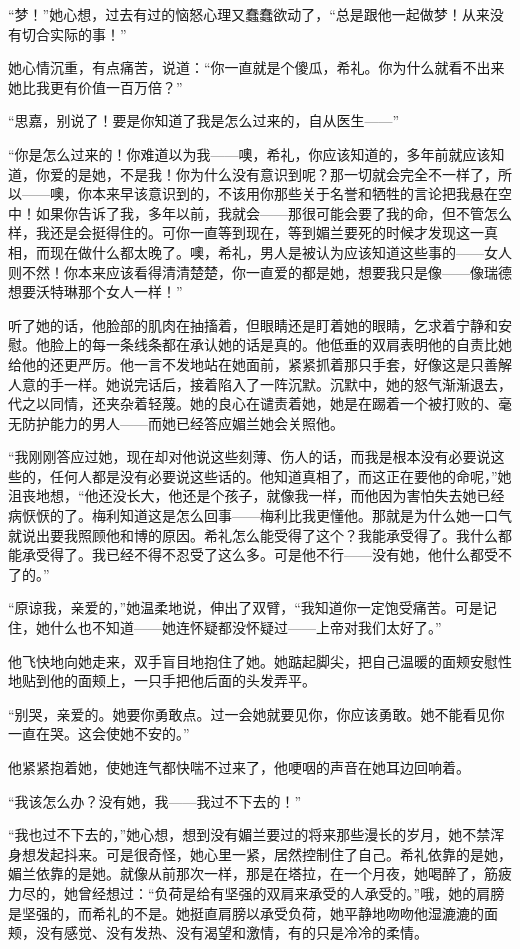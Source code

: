 \par “梦！”她心想，过去有过的恼怒心理又蠢蠢欲动了，“总是跟他一起做梦！从来没有切合实际的事！”
\par 她心情沉重，有点痛苦，说道：“你一直就是个傻瓜，希礼。你为什么就看不出来她比我更有价值一百万倍？”
\par “思嘉，别说了！要是你知道了我是怎么过来的，自从医生——”
\par “你是怎么过来的！你难道以为我——噢，希礼，你应该知道的，多年前就应该知道，你爱的是她，不是我！你为什么没有意识到呢？那一切就会完全不一样了，所以——噢，你本来早该意识到的，不该用你那些关于名誉和牺牲的言论把我悬在空中！如果你告诉了我，多年以前，我就会——那很可能会要了我的命，但不管怎么样，我还是会挺得住的。可你一直等到现在，等到媚兰要死的时候才发现这一真相，而现在做什么都太晚了。噢，希礼，男人是被认为应该知道这些事的——女人则不然！你本来应该看得清清楚楚，你一直爱的都是她，想要我只是像——像瑞德想要沃特琳那个女人一样！”
\par 听了她的话，他脸部的肌肉在抽搐着，但眼睛还是盯着她的眼睛，乞求着宁静和安慰。他脸上的每一条线条都在承认她的话是真的。他低垂的双肩表明他的自责比她给他的还更严厉。他一言不发地站在她面前，紧紧抓着那只手套，好像这是只善解人意的手一样。她说完话后，接着陷入了一阵沉默。沉默中，她的怒气渐渐退去，代之以同情，还夹杂着轻蔑。她的良心在谴责着她，她是在踢着一个被打败的、毫无防护能力的男人——而她已经答应媚兰她会关照他。
\par “我刚刚答应过她，现在却对他说这些刻薄、伤人的话，而我是根本没有必要说这些的，任何人都是没有必要说这些话的。他知道真相了，而这正在要他的命呢，”她沮丧地想，“他还没长大，他还是个孩子，就像我一样，而他因为害怕失去她已经病恹恹的了。梅利知道这是怎么回事——梅利比我更懂他。那就是为什么她一口气就说出要我照顾他和博的原因。希礼怎么能受得了这个？我能承受得了。我什么都能承受得了。我已经不得不忍受了这么多。可是他不行——没有她，他什么都受不了的。”
\par “原谅我，亲爱的，”她温柔地说，伸出了双臂，“我知道你一定饱受痛苦。可是记住，她什么也不知道——她连怀疑都没怀疑过——上帝对我们太好了。”
\par 他飞快地向她走来，双手盲目地抱住了她。她踮起脚尖，把自己温暖的面颊安慰性地贴到他的面颊上，一只手把他后面的头发弄平。
\par “别哭，亲爱的。她要你勇敢点。过一会她就要见你，你应该勇敢。她不能看见你一直在哭。这会使她不安的。”
\par 他紧紧抱着她，使她连气都快喘不过来了，他哽咽的声音在她耳边回响着。
\par “我该怎么办？没有她，我——我过不下去的！”
\par “我也过不下去的，”她心想，想到没有媚兰要过的将来那些漫长的岁月，她不禁浑身想发起抖来。可是很奇怪，她心里一紧，居然控制住了自己。希礼依靠的是她，媚兰依靠的是她。就像从前那次一样，那是在塔拉，在一个月夜，她喝醉了，筋疲力尽的，她曾经想过：“负荷是给有坚强的双肩来承受的人承受的。”哦，她的肩膀是坚强的，而希礼的不是。她挺直肩膀以承受负荷，她平静地吻吻他湿漉漉的面颊，没有感觉、没有发热、没有渴望和激情，有的只是冷冷的柔情。
